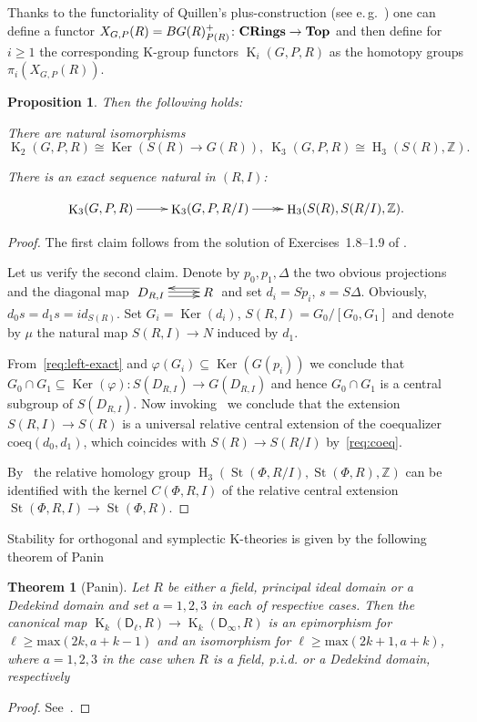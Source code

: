 \documentclass[oneside, 10pt]{amsart}
\newtheorem{prop}{Proposition}
\newtheorem{theorem}{Theorem}
\theoremstyle{remark}
\theoremstyle{definition}
\DeclareMathOperator{\Ker}{Ker}
\DeclareMathOperator{\St}{St}
\DeclareMathOperator{\HH}{H}
\DeclareMathOperator{\K}{K}
\newcommand{\catname}[1]{{\normalfont\textbf{#1}}} %
\newcommand{\ZZ}{\mathbb{Z}}
\newcommand{\rD}{\mathsf{D}}
\numberwithin{equation}{section}
\begin{document}
Thanks to the functoriality of Quillen's plus-construction (see e.\,g.~\cite[Proposition~5.2.4]{Ro95}) one can define a functor 
$X_{G, P}(R) = BG(R)^+_{P(R)} \colon \catname{CRings} \to \catname{Top}$ and then define for $i \geq 1$ the corresponding K-group functors $\K_{i}(G, P, R)$ as the homotopy groups $\pi_i(X_{G, P}(R))$.

\begin{prop}\label{characterization}
 Then the following holds:
\begin{proplist}
 \item There are natural isomorphisms
  \[ \K_2(G, P, R) \cong \Ker(S(R) \to G(R)), \ \K_3(G, P, R) \cong \HH_3(S(R), \ZZ). \]
 \item There is an exact sequence natural in $(R, I)$:
 \end{proplist}
 \[ \xymatrix{\K_3(G, P, R) \ar[r] & \K_3(G, P, R/I) \ar@{->>}[r] & \HH_3(S(R), S(R/I), \ZZ).} \]
\end{prop}
\begin{proof}
 The first claim follows from the solution of Exercises~1.8--1.9 of \cite[Chapter~IV]{Kbook}. %
 
 Let us verify the second claim.
 Denote by $p_0, p_1, \Delta$ the two obvious projections and the diagonal map $\xymatrix{D_{R,I} \ar@<1pt>[r] \ar@<-2.5pt>[r] & \ar@<-4pt>[l] R}$
  and set $d_i = Sp_i$, $s = S\Delta$.
 Obviously, $d_0s = d_1 s = id_{S(R)}$. Set $G_i = \Ker(d_i)$, $S(R, I) = G_0 / [G_0, G_1]$ and denote by $\mu$ the natural map $S(R, I) \to N$ induced by $d_1$.
 
 From~\eqref{req:left-exact} and $\varphi(G_i) \subseteq \Ker(G(p_i))$ we conclude that $G_0 \cap G_1 \subseteq \Ker(\varphi) \colon S(D_{R, I}) \to G(D_{R, I})$
  and hence $G_0 \cap G_1$ is a central subgroup of $S(D_{R, I})$.
 Now invoking~\cite[Proposition~6]{Lo78} we conclude that the extension $S(R, I) \to S(R)$ is a universal relative central extension of the coequalizer $\mathrm{coeq}(d_0, d_1)$, 
   which coincides with $S(R) \to S(R/I)$ by~\eqref{req:coeq}.

 
 
 By~\cite[Th{\'e}or{\`e}me~2]{Lo78} the relative homology group $\HH_3(\St(\Phi, R/I), \St(\Phi, R), \ZZ)$ can be identified
 with the kernel $C(\Phi, R, I)$ of the relative central extension $\St(\Phi, R, I) \to \St(\Phi, R)$.
\end{proof}

Stability for orthogonal and symplectic K-theories is given by the following theorem of Panin
\begin{theorem}[Panin] \label{lem:Panin-stability}
 Let $R$ be either a field, principal ideal domain or a Dedekind domain and set $a = 1,2,3$ in each of respective cases.
 Then the canonical map $\K_k(\rD_\ell, R) \to \K_k(\rD_\infty, R)$ is an epimorphism for $\ell \geq \mathrm{max}(2k, a+k-1)$ 
 and an isomorphism for $\ell \geq \mathrm{max}(2k+1, a+k)$, where $a=1,2,3$ in the case when $R$ is a field, p.i.d. or a Dedekind domain, respectively \end{theorem}
\begin{proof} See~\cite[Theorem~9.4]{Pa89}. \end{proof}
 
\end{document}
